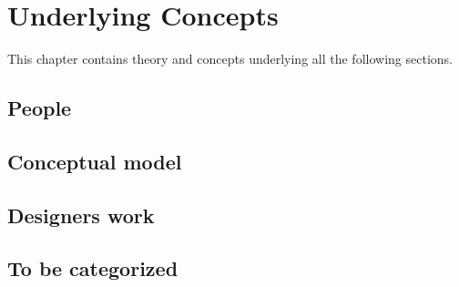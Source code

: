 \chapter{Underlying Concepts} \label{chap:concepts}
This chapter contains theory and concepts underlying all the following sections.

\section{People}


\section{Conceptual model} \label{sec:conceptual_model}




\section{Designers work}


\section{To be categorized}

